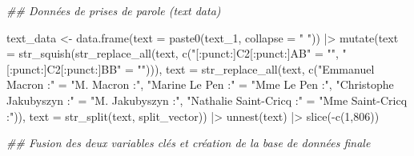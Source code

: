 \documentclass[
  letterpaper,
  DIV=11,
  numbers=noendperiod]{scrartcl}
\newenvironment{Shaded}{\begin{snugshade}}{\end{snugshade}}
\newcommand{\AttributeTok}[1]{\textcolor[rgb]{0.40,0.45,0.13}{#1}}
\newcommand{\DecValTok}[1]{\textcolor[rgb]{0.68,0.00,0.00}{#1}}
\newcommand{\DocumentationTok}[1]{\textcolor[rgb]{0.37,0.37,0.37}{\textit{#1}}}
\newcommand{\FunctionTok}[1]{\textcolor[rgb]{0.28,0.35,0.67}{#1}}
\newcommand{\NormalTok}[1]{\textcolor[rgb]{0.00,0.23,0.31}{#1}}
\newcommand{\OtherTok}[1]{\textcolor[rgb]{0.00,0.23,0.31}{#1}}
\newcommand{\SpecialCharTok}[1]{\textcolor[rgb]{0.37,0.37,0.37}{#1}}
\newcommand{\StringTok}[1]{\textcolor[rgb]{0.13,0.47,0.30}{#1}}
\begin{document}
\begin{Shaded}
\begin{Highlighting}[]
\DocumentationTok{\#\# Données de prises de parole (text data)}

\NormalTok{text\_data }\OtherTok{\textless{}{-}} \FunctionTok{data.frame}\NormalTok{(}\AttributeTok{text =} \FunctionTok{paste0}\NormalTok{(text\_1, }\AttributeTok{collapse =} \StringTok{" "}\NormalTok{)) }\SpecialCharTok{|\textgreater{}} 
    \FunctionTok{mutate}\NormalTok{(}\AttributeTok{text =} \FunctionTok{str\_squish}\NormalTok{(}\FunctionTok{str\_replace\_all}\NormalTok{(text, }\FunctionTok{c}\NormalTok{(}\StringTok{"[:punct:]C2[:punct:]AB"}  \OtherTok{=} \StringTok{""}\NormalTok{,}
                                                     \StringTok{"[:punct:]C2[:punct:]BB"}  \OtherTok{=} \StringTok{""}\NormalTok{))),}
           \AttributeTok{text =} \FunctionTok{str\_replace\_all}\NormalTok{(text, }\FunctionTok{c}\NormalTok{(}\StringTok{"Emmanuel Macron :"}       \OtherTok{=} \StringTok{"M. Macron :"}\NormalTok{,}
                                          \StringTok{"Marine Le Pen :"}         \OtherTok{=} \StringTok{"Mme Le Pen :"}\NormalTok{,}
                                          \StringTok{"Christophe Jakubyszyn :"} \OtherTok{=} \StringTok{"M. Jakubyszyn :"}\NormalTok{,}
                                          \StringTok{"Nathalie Saint{-}Cricq :"}  \OtherTok{=} \StringTok{"Mme Saint{-}Cricq :"}\NormalTok{)),}
           \AttributeTok{text =} \FunctionTok{str\_split}\NormalTok{(text, split\_vector)) }\SpecialCharTok{|\textgreater{}}
  \FunctionTok{unnest}\NormalTok{(text) }\SpecialCharTok{|\textgreater{}} 
  \FunctionTok{slice}\NormalTok{(}\SpecialCharTok{{-}}\FunctionTok{c}\NormalTok{(}\DecValTok{1}\NormalTok{,}\DecValTok{806}\NormalTok{)) }

\DocumentationTok{\#\# Fusion des deux variables clés et création de la base de données finale}


\end{Highlighting}
\end{Shaded}
\end{document}
